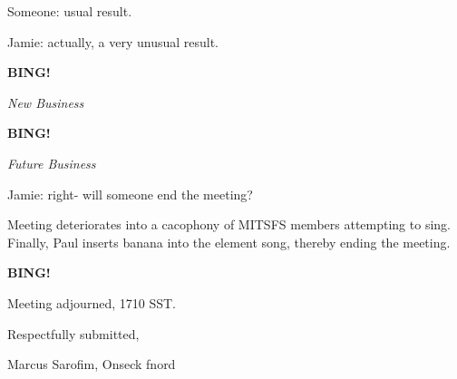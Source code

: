 \documentclass[12pt]{article}
\newcommand{\bing}{{\bf BING!} }
\newcommand{\goto}[1]{\bing \vskip 12pt \centerline{{\em{#1}}}}
\begin{document}
Someone: usual result.

Jamie: actually, a very unusual result.

\goto{New Business}

\goto{Future Business}

Jamie: right- will someone end the meeting?

Meeting deteriorates into a cacophony of MITSFS members attempting to sing. Finally, Paul inserts banana into the element song, thereby ending the meeting.

\bing

\vspace{12pt}

\noindent
Meeting adjourned, 1710 SST.

\vspace{18pt}

\centerline{Respectfully submitted,}
\centerline{Marcus Sarofim, Onseck fnord}
\end{document}
